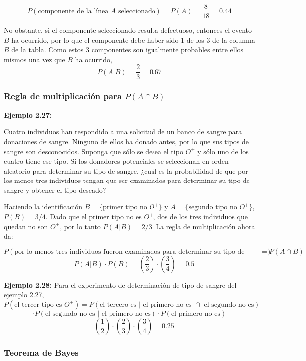 \documentclass[a4paper]{article}
\begin{document}
$$ P(\text{componente de la línea } A \text{ seleccionado}) = P(A) = \frac{8}{18} = 0.44 $$

No obstante, si el componente seleccionado resulta defectuoso, entonces el evento $B$ ha ocurrido, por lo que el componente debe haber sido 1 de los 3 de la columna $B$ de la tabla. Como estos 3 componentes son igualmente probables entre ellos mismos una vez que $B$ ha ocurrido,
$$ P(A | B) = \frac{2}{3} = 0.67 $$

\subsubsection{Regla de multiplicación para $P(A\cap B)$}


\textbf{Ejemplo 2.27:}

Cuatro individuos han respondido a una solicitud de un banco de sangre para donaciones de sangre. Ninguno de ellos ha donado antes, por lo que sus tipos de sangre son desconocidos. Suponga que sólo se desea el tipo $O^+$ y sólo uno de los cuatro tiene ese tipo. Si los donadores potenciales se seleccionan en orden aleatorio para determinar su tipo de sangre, ¿cuál es la probabilidad de que por los menos tres individuos tengan que ser examinados para determinar su tipo de sangre y obtener el tipo deseado?

Haciendo la identificación $B = \{\text{primer tipo no } O^+\}$ y $A = \{\text{segundo tipo no } O^+\}$, $P(B) = 3/4$. Dado que el primer tipo no es $O^+$, dos de los tres individuos que quedan no son $O^+$, por lo tanto $P(A | B) = 2/3$. La regla de multiplicación ahora da:

$$ P(\text{por lo menos tres individuos fueron examinados para determinar su tipo de sangre}) = P(A \cap B) $$
$$ = P(A | B) \cdot P(B) = \left( \frac{2}{3} \right) \cdot \left( \frac{3}{4} \right) = 0.5 $$

\textbf{Ejemplo 2.28:}
Para el experimento de determinación de tipo de sangre del ejemplo 2.27,
$$ P(\text{el tercer tipo es } O^+) = P(\text{el tercero es } | \text{ el primero no es } \cap \text{ el segundo no es}) $$
$$ \cdot P(\text{el segundo no es } | \text{ el primero no es}) \cdot P(\text{el primero no es}) $$
$$ = \left( \frac{1}{2} \right) \cdot \left( \frac{2}{3} \right) \cdot \left( \frac{3}{4} \right) = 0.25 $$


\subsubsection{Teorema de Bayes}
\end{document}
